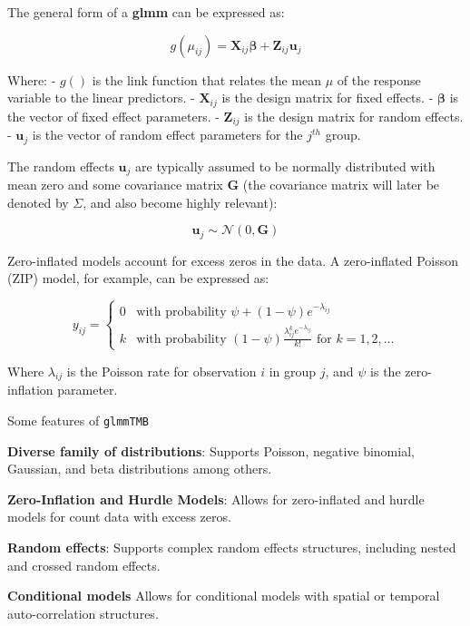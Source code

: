 \documentclass[12pt, twoside,hidelinks]{article}
\theoremstyle{definition}
\numberwithin{equation}{section}
\begin{document}
The general form of a \textbf{glmm} can be expressed as:

\[
g(\mu_{ij}) = \mathbf{X}_{ij} \boldsymbol{\beta} + \mathbf{Z}_{ij} \mathbf{u}_{j}
\]

Where:
- \( g() \) is the link function that relates the mean \( \mu \) of the response variable to the linear predictors.
- \( \mathbf{X}_{ij} \) is the design matrix for fixed effects.
- \( \boldsymbol{\beta} \) is the vector of fixed effect parameters.
- \( \mathbf{Z}_{ij} \) is the design matrix for random effects.
- \( \mathbf{u}_{j} \) is the vector of random effect parameters for the \( j^{th} \) group.

The random effects \( \mathbf{u}_{j} \) are typically assumed to be normally distributed with mean zero and some covariance matrix \( \mathbf{G} \) (the covariance matrix will later be denoted by $\Sigma$, and also become highly relevant):

\[
\mathbf{u}_{j} \sim \mathcal{N}(0, \mathbf{G})
\]

Zero-inflated models account for excess zeros in the data. A zero-inflated Poisson (ZIP) model, for example, can be expressed as:

\[
y_{ij} = 
\begin{cases} 
0 & \text{with probability } \psi + (1-\psi)e^{-\lambda_{ij}} \\
k & \text{with probability } (1-\psi)\frac{\lambda_{ij}^k e^{-\lambda_{ij}}}{k!} \text{ for } k=1,2,\ldots
\end{cases}
\]

Where \( \lambda_{ij} \) is the Poisson rate for observation \( i \) in group \( j \), and \( \psi \) is the zero-inflation parameter.

Some features of \texttt{glmmTMB}
\newline

\textbf{Diverse family of distributions}: Supports Poisson, negative binomial, Gaussian, and beta distributions among others.
\newline

\textbf{Zero-Inflation and Hurdle Models}: Allows for zero-inflated and hurdle models for count data with excess zeros.
\newline

\textbf{Random effects}: Supports complex random effects structures, including nested and crossed random effects.
\newline

\textbf{Conditional models} Allows for conditional models with spatial or temporal auto-correlation structures.
\newline
\end{document}
